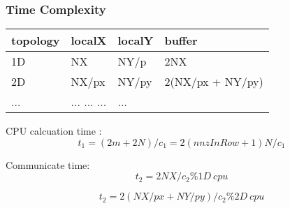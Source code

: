 \documentclass[mathserif]{beamer}
\begin{document}
\begin{frame}
\frametitle{Time Complexity}

		
\begin{block}{}
\begin{center}
	\small
	\begin{tabular} {|l |l |l | l|}	
	\hline
	topology & localX &   localY  & buffer \\ \hline
	1D	&  NX & NY/p & 2NX \\ \hline
	2D	&  NX/px & NY/py & 2(NX/px + NY/py)\\ \hline
	...	& 	...	... 	...		&  ... \\
	\hline
	\end{tabular}
\end{center}
\end{block}


\begin{block}{}
\small
CPU calcuation time :  
\begin{equation}
t_1 = (2m + 2N)/c_1 = 2(nnzInRow+1)N/c_1 
\end{equation}  

Communicate time:
	\begin{equation}
	 t_2 = 2NX/c_2  \%1D\ cpu 
	\end{equation}

	\begin{equation}	
	t_2 = 2(NX/px + NY/py)/c_2 \%2D\ cpu
	\end{equation} 
\end{block}

\end{frame}
\end{document}
